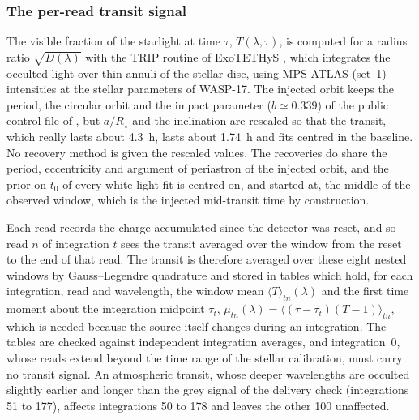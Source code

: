 \subsubsection{The per-read transit signal}
\label{sec:per-read}

The visible fraction of the starlight at time $\tau$, $T(\lambda,\tau)$, is computed for a
radius ratio $\sqrt{D(\lambda)}$ with the TRIP routine of ExoTETHyS
\citep{MorelloEtAl2020}, which integrates the occulted light over thin
annuli of the stellar disc, using MPS-ATLAS (set~1) intensities
\citep{KostogryzEtAl2022,KostogryzEtAl2023} at the stellar parameters of
WASP-17. The injected orbit keeps the period, the circular orbit and the
impact parameter ($b\simeq0.339$) of the public control file of
\citet{LouieEtAl2025}, but $a/R_\star$ and the inclination are rescaled so
that the transit, which really lasts about 4.3~h, lasts about 1.74~h and fits
centred in the baseline. No recovery method is given the rescaled values. The recoveries do share the
period, eccentricity and argument of periastron of the injected orbit, and
the prior on $t_0$ of every white-light fit is centred on, and started at,
the middle of the observed window, which is the injected mid-transit time by
construction.

Each read records the charge accumulated since the detector was reset, and
so read $n$ of integration $t$ sees the transit averaged over the window from
the reset to the end of that read. The transit is therefore averaged over
these eight nested windows by Gauss--Legendre quadrature and stored in
tables which hold, for each integration, read and wavelength, the window mean
$\langle T\rangle_{tn}(\lambda)$ and the first time moment about the
integration midpoint $\tau_t$,
$\mu_{tn}(\lambda)=\langle(\tau-\tau_t)(T-1)\rangle_{tn}$, which is needed
because the source itself changes during an integration. The tables are
checked against independent integration averages, and integration~0, whose
reads extend beyond the time range of the stellar calibration, must carry no
transit signal. An atmospheric transit, whose deeper wavelengths are occulted
slightly earlier and longer than the grey signal of the delivery check (integrations 51 to 177),
affects integrations 50 to 178 and leaves the other 100 unaffected.

